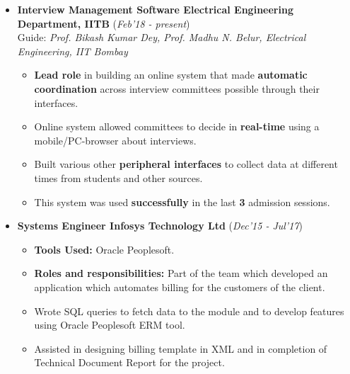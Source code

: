 \documentclass[10pt]{article}
\begin{document}
\vspace{-0.1cm}
\begin{itemize}[leftmargin=0.4cm]
	\item \textbf{Interview Management Software \textpipe  \hspace{0.05cm} Electrical Engineering Department, IITB} \hfill{(\textit{Feb'18 - present})}\\
	Guide: \textit{Prof. Bikash Kumar Dey, Prof. Madhu N. Belur, Electrical Engineering, IIT Bombay}\\
\vspace{-0.65cm}
\begin{itemize}

		\item \textbf{Lead role }in building an online system that made \textbf{automatic
coordination }across interview committees possible through their interfaces.\vspace{-0.1cm}
		\item Online system allowed committees to decide in \textbf{real-time} using a mobile/PC-browser about interviews.
		\item Built various other \textbf{peripheral
interfaces} to collect data at different times from students and other sources.
		\item This system was used \textbf{successfully} in the last \textbf{3} admission sessions.
	\end{itemize}
\end{itemize}
\vspace{-0.55cm}
\begin{itemize}[leftmargin=0.4cm]
	\item \textbf{Systems Engineer \textpipe  \hspace{0.05cm} Infosys Technology Ltd} \hfill{(\textit{Dec'15 - Jul'17})}\\
	\vspace{-0.65cm}
	\begin{itemize}
	    \item  \textbf{Tools Used:} Oracle Peoplesoft.\vspace{-0.07cm}
		\item \textbf{Roles and responsibilities:} Part of the team which developed an application which automates billing for the customers of the client.\vspace{-0.1cm}
		\item Wrote SQL queries to fetch data to the module and to develop features using Oracle Peoplesoft ERM tool.
		\item Assisted in designing billing template in XML and in completion of Technical Document Report for the project.
	
	\end{itemize}
\end{itemize}
\end{document}
